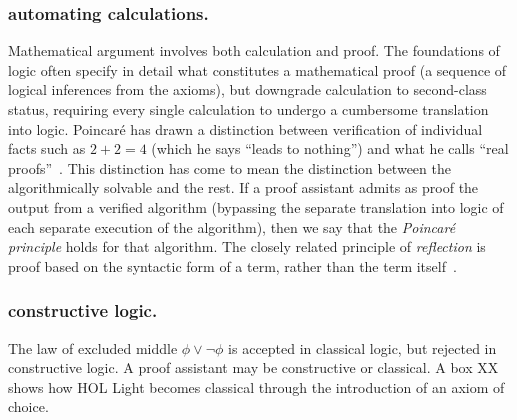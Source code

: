 \documentclass{llncs}
\begin{document}
\subsubsection{automating calculations.} Mathematical argument
involves both calculation and proof.  The foundations of logic often
specify in detail what constitutes a mathematical proof (a sequence of
logical inferences from the axioms), but downgrade calculation to
second-class status, requiring every single calculation to undergo a
cumbersome translation into logic.  Poincar\'e has drawn a distinction
between verification of individual facts such as $2+2=4$ (which he
says ``leads to nothing'') and what he calls ``real
proofs''~\cite[p.~4]{HPSH}.  This distinction has come to mean the
distinction between the algorithmically solvable and the rest.  If a
proof assistant admits as proof the output from a verified algorithm
(bypassing the separate translation into logic of each separate
execution of the algorithm), then we say that the {\it Poincar\'e
  principle} holds for that algorithm.  The closely related principle
of {\it reflection} is proof based on the syntactic form of a term,
rather than the term itself~\cite{BFM}.



\subsubsection{constructive logic.} The
law of excluded middle $\phi\lor\lnot \phi$ is accepted in classical
logic, but rejected in constructive logic.  A proof assistant
may be constructive or classical.  A box XX shows how HOL Light becomes
classical through the introduction of an axiom of choice.

\newpage
\bigskip
\noindent
\end{document}
